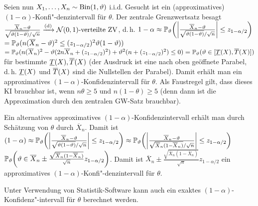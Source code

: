 \begin{Bsp}
    Seien nun $X_1, \dotsc, X_n \sim \operatorname{Bin}(1, \vartheta)$ i.i.d.
    Gesucht ist ein (approximatives) $(1 - \alpha)$-Konfi"-denzintervall für $\theta$.
    Der zentrale Grenzwertsatz besagt\\
    $\frac{\overline{X}_n - \vartheta}{\sqrt{\vartheta (1 - \vartheta)}/\sqrt{n}} \xrightarrow{\text{(d)}}
    \mathcal{N}(0, 1)\text{-verteilte ZV}$,
    d.\,h. $1 - \alpha \approx \mathbb{P}_\vartheta\!\left(\left|\frac{\overline{X}_n - \vartheta}
    {\sqrt{\vartheta (1 - \vartheta)}/\sqrt{n}}\right| \le z_{1-\alpha/2}\right)$\\
    $= \mathbb{P}_\vartheta(n (\overline{X}_n - \vartheta)^2 \le (z_{1-\alpha/2})^2 \vartheta (1 - \vartheta))$\\
    $= \mathbb{P}_\vartheta(n (\overline{X}_n)^2 - \vartheta (2n \overline{X}_n + (z_{1-\alpha/2})^2) +
    \vartheta^2 (n + (z_{1-\alpha/2})^2) \le 0) = \mathbb{P}_\vartheta(\vartheta \in [\underline{T}(X), \overline{T}(X)])$\\
    für bestimmte $\underline{T}(X), \overline{T}(X)$
    (der Ausdruck ist eine nach oben geöffnete Parabel, d.\,h. $\underline{T}(X)$ und $\overline{T}(X)$ sind die
    Nullstellen der Parabel).
    Damit erhält man ein approximatives $(1 - \alpha)$-Konfidenzintervall für $\theta$.
    Als Faustregel gilt, dass dieses KI brauchbar ist, wenn $n\theta \ge 5$ und
    $n(1-\theta) \ge 5$
    (denn dann ist die Approximation durch den zentralen GW-Satz brauchbar).

    Ein alternatives approximatives $(1 - \alpha)$-Konfidenzintervall erhält man durch
    Schätzung von $\theta$ durch $\overline{X}_n$.
    Damit ist
    $(1 - \alpha) \approx \mathbb{P}_\vartheta\!\left(\left|\frac{\overline{X}_n - \vartheta}
    {\sqrt{\vartheta (1 - \vartheta)}/\sqrt{n}}\right| \le z_{1-\alpha/2}\right)
    \approx \mathbb{P}_\vartheta\!\left(\left|\frac{\overline{X}_n - \vartheta}
    {\sqrt{\overline{X}_n (1 - \overline{X}_n)}/\sqrt{n}}\right| \le z_{1-\alpha/2}\right)$\\
    $\mathbb{P}_\vartheta\!\left(\vartheta \in \overline{X}_n \pm
    \frac{\sqrt{\overline{X}_n (1 - \overline{X}_n)}}{\sqrt{n}} z_{1 - \alpha/2}\right)$.
    Damit ist $\overline{X}_n \pm
    \frac{\sqrt{\overline{X}_n (1 - \overline{X}_n)}}{\sqrt{n}} z_{1 - \alpha/2}$ ein
    approximatives $(1 - \alpha)$-Konfi"-denzintervall für $\theta$.
\end{Bsp}

\begin{Bem}
    Unter Verwendung von Statistik-Software kann auch ein exaktes
    $(1 - \alpha)$-Konfidenz"-intervall für $\theta$ berechnet werden.
\end{Bem}

